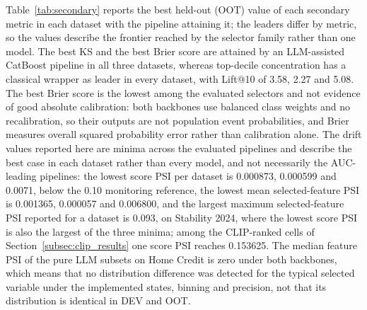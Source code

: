 \documentclass[final,5p,twocolumn]{elsarticle}
\begin{document}
Table~\ref{tab:secondary} reports the best held-out (OOT) value of each secondary metric in each dataset with the pipeline attaining it; the leaders differ by metric, so the values describe the frontier reached by the selector family rather than one model. The best KS and the best Brier score are attained by an LLM-assisted CatBoost pipeline in all three datasets, whereas top-decile concentration has a classical wrapper as leader in every dataset, with Lift@10 of 3.58, 2.27 and 5.08. The best Brier score is the lowest among the evaluated selectors and not evidence of good absolute calibration: both backbones use balanced class weights and no recalibration, so their outputs are not population event probabilities, and Brier measures overall squared probability error rather than calibration alone. The drift values reported here are minima across the evaluated pipelines and describe the best case in each dataset rather than every model, and not necessarily the AUC-leading pipelines: the lowest score PSI per dataset is 0.000873, 0.000599 and 0.0071, below the 0.10 monitoring reference, the lowest mean selected-feature PSI is 0.001365, 0.000057 and 0.006800, and the largest maximum selected-feature PSI reported for a dataset is 0.093, on Stability 2024, where the lowest score PSI is also the largest of the three minima; among the CLIP-ranked cells of Section~\ref{subsec:clip_results} one score PSI reaches 0.153625. The median feature PSI of the pure LLM subsets on Home Credit is zero under both backbones, which means that no distribution difference was detected for the typical selected variable under the implemented states, binning and precision, not that its distribution is identical in DEV and OOT.
\end{document}
